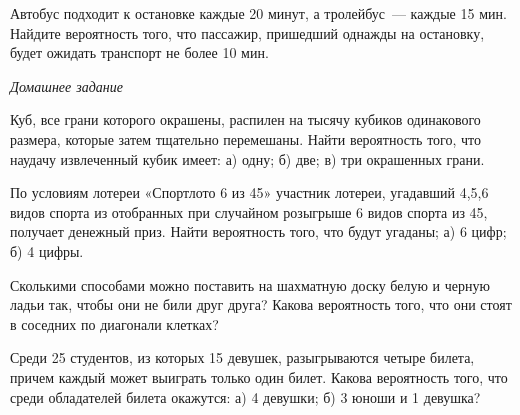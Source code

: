 \documentclass[a4paper,14pt]{extarticle}
\begin{document}
\begin{enumerate}
\item Автобус подходит к остановке каждые 20 минут, а тролейбус~--- каждые 15 мин. Найдите вероятность того, что пассажир, пришедший однажды на остановку, будет ожидать транспорт не более 10 мин.


{\item[]\centering \itshape Домашнее задание\par}




\item 
Куб, все грани которого окрашены, распилен на тысячу кубиков
одинакового размера, которые затем тщательно перемешаны. Найти
вероятность того, что наудачу извлеченный кубик имеет: а) одну; б) две;
в) три окрашенных грани.

\item 
По условиям лотереи «Спортлото 6 из 45» участник лотереи, угадавший
4,5,6 видов спорта из отобранных при случайном розыгрыше 6 видов спорта
из 45, получает денежный приз. Найти вероятность того, что будут
угаданы; а) 6 цифр; б) 4 цифры.





\item 
Сколькими способами можно поставить на шахматную доску белую и черную ладьи так, чтобы они не били друг друга? Какова вероятность того, что они стоят в соседних по диагонали клетках?

\item 
Среди 25 студентов, из которых 15 девушек, разыгрываются четыре
билета, причем каждый может выиграть только один билет. Какова
вероятность того, что среди обладателей билета окажутся: а) 4 девушки;
б) 3 юноши и 1 девушка?




\end{enumerate}
\end{document}
